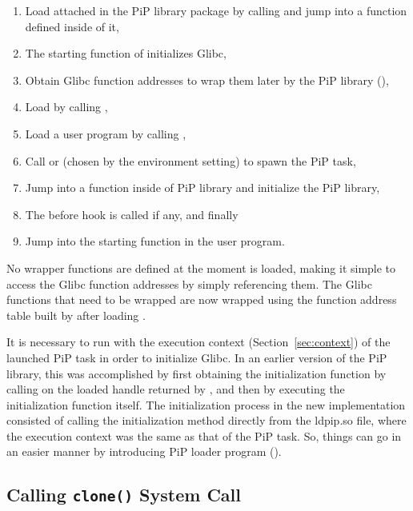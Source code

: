 \begin{enumerate}
\item Load  attached in the PiP library package by
  calling  and jump into a function defined inside
  of it, 
\item The starting function of  initializes Glibc,
\item Obtain Glibc function addresses to wrap them later by the PiP
  library (),
\item Load  by calling ,
\item Load a user program by calling ,
\item Call  or  (chosen
  by the  environment setting) to spawn the PiP task, 
\item Jump into a function inside of PiP library and initialize the
  PiP library, 
\item The before hook is called if any, and finally
\item Jump into the starting function in the user program.
\end{enumerate}

No wrapper functions are defined at the moment  is
loaded, making it simple to access the Glibc function addresses by
simply referencing them. The Glibc functions that need to be wrapped
are now wrapped using the function address table built by
 after loading .

It is necessary to run  with the execution
context (Section~\ref{sec:context}) of the launched PiP task in order
to initialize Glibc. In an earlier version of the PiP library, this
was accomplished by first obtaining the initialization function by
calling  on the loaded handle returned by
, and then by executing the 
initialization function itself. The initialization process in the new
implementation consisted of calling the initialization method directly
from the ldpip.so file, where the execution context was the same as
that of the PiP task. So, things can go in an easier manner by
introducing PiP loader program ().

\subsection{Calling {\tt clone()} System Call}\label{sec:clone}

